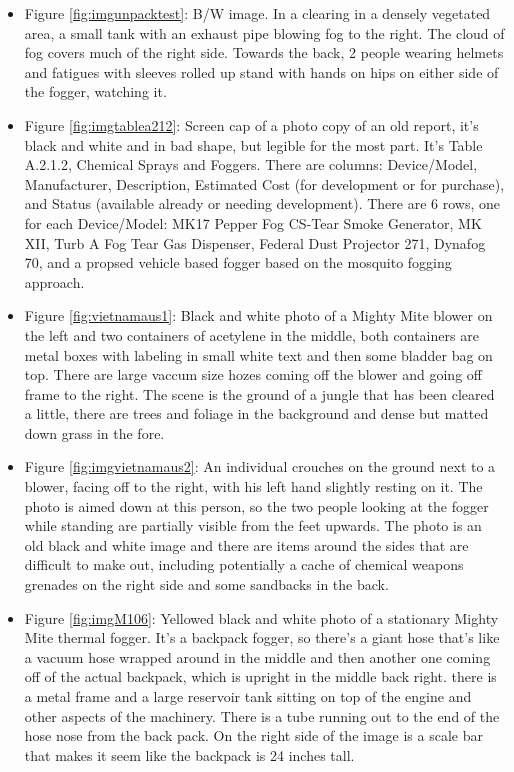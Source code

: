 \documentclass[
  11pt,
]{krantz}
\begin{document}
\begin{itemize}
\item
  Figure \ref{fig:imgunpacktest}: B/W image. In a clearing in a densely vegetated area, a small tank with an exhaust pipe blowing fog to the right. The cloud of fog covers much of the right side. Towards the back, 2 people wearing helmets and fatigues with sleeves rolled up stand with hands on hips on either side of the fogger, watching it.
\item
  Figure \ref{fig:imgtablea212}: Screen cap of a photo copy of an old report, it's black and white and in bad shape, but legible for the most part. It's Table A.2.1.2, Chemical Sprays and Foggers. There are columns: Device/Model, Manufacturer, Description, Estimated Cost (for development or for purchase), and Status (available already or needing development). There are 6 rows, one for each Device/Model: MK17 Pepper Fog CS-Tear Smoke Generator, MK XII, Turb A Fog Tear Gas Dispenser, Federal Dust Projector 271, Dynafog 70, and a propsed vehicle based fogger based on the mosquito fogging approach.
\item
  Figure \ref{fig:vietnamaus1}: Black and white photo of a Mighty Mite blower on the left and two containers of acetylene in the middle, both containers are metal boxes with labeling in small white text and then some bladder bag on top. There are large vaccum size hozes coming off the blower and going off frame to the right. The scene is the ground of a jungle that has been cleared a little, there are trees and foliage in the background and dense but matted down grass in the fore.
\item
  Figure \ref{fig:imgvietnamaus2}: An individual crouches on the ground next to a blower, facing off to the right, with his left hand slightly resting on it. The photo is aimed down at this person, so the two people looking at the fogger while standing are partially visible from the feet upwards. The photo is an old black and white image and there are items around the sides that are difficult to make out, including potentially a cache of chemical weapons grenades on the right side and some sandbacks in the back.
\item
  Figure \ref{fig:imgM106}: Yellowed black and white photo of a stationary Mighty Mite thermal fogger. It's a backpack fogger, so there's a giant hose that's like a vacuum hose wrapped around in the middle and then another one coming off of the actual backpack, which is upright in the middle back right. there is a metal frame and a large reservoir tank sitting on top of the engine and other aspects of the machinery. There is a tube running out to the end of the hose nose from the back pack. On the right side of the image is a scale bar that makes it seem like the backpack is 24 inches tall.

\end{itemize}
\end{document}
